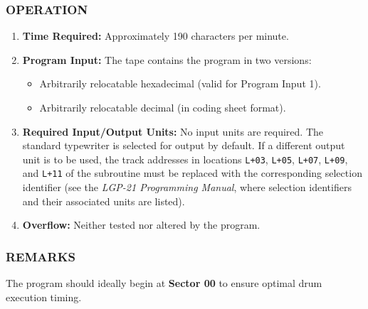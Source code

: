 \subsubsection*{OPERATION}
\begin{enumerate}
    \item \textbf{Time Required:} Approximately 190 characters per minute.
    \item \textbf{Program Input:} The tape contains the program in two versions:
    \begin{itemize}
        \item[\textbf{a)}] Arbitrarily relocatable hexadecimal (valid for Program Input 1).
        \item[\textbf{b)}] Arbitrarily relocatable decimal (in coding sheet format).
    \end{itemize}
    \item \textbf{Required Input/Output Units:} No input units are required. The standard typewriter is selected for output by default. If a different output unit is to be used, the track addresses in locations \texttt{L+03}, \texttt{L+05}, \texttt{L+07}, \texttt{L+09}, and \texttt{L+11} of the subroutine must be replaced with the corresponding selection identifier (see the \textit{LGP-21 Programming Manual}, where selection identifiers and their associated units are listed).
    \item \textbf{Overflow:} Neither tested nor altered by the program.
\end{enumerate}

\subsubsection*{REMARKS}
The program should ideally begin at \textbf{Sector 00} to ensure optimal drum execution timing.
\newpage